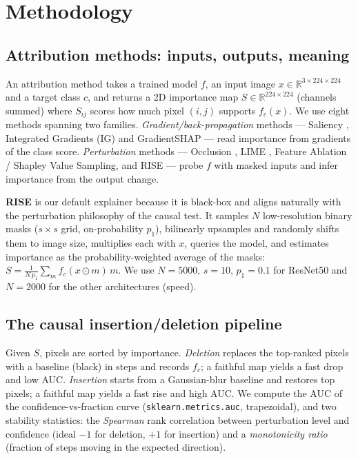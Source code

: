 \documentclass[11pt]{article}
\begin{document}
\section{Methodology}

\subsection{Attribution methods: inputs, outputs, meaning}
An attribution method takes a trained model $f$, an input image
$x\in\mathbb{R}^{3\times224\times224}$ and a target class $c$, and returns a 2D
importance map $S\in\mathbb{R}^{224\times224}$ (channels summed) where $S_{ij}$
scores how much pixel $(i,j)$ supports $f_c(x)$. We use eight methods spanning
two families. \emph{Gradient/back-propagation} methods --- Saliency
\citep{simonyan2014deep}, Integrated Gradients (IG)
\citep{sundararajan2017axiomatic} and GradientSHAP \citep{lundberg2017unified}
--- read importance from gradients of the class score. \emph{Perturbation}
methods --- Occlusion \citep{zeiler2014visualizing}, LIME
\citep{ribeiro2016why}, Feature Ablation / Shapley Value Sampling, and RISE
\citep{petsiuk2018rise} --- probe $f$ with masked inputs and infer importance
from the output change.

\textbf{RISE} is our default explainer because it is black-box and aligns
naturally with the perturbation philosophy of the causal test. It samples $N$
low-resolution binary masks ($s\times s$ grid, on-probability $p_1$), bilinearly
upsamples and randomly shifts them to image size, multiplies each with $x$,
queries the model, and estimates importance as the probability-weighted average
of the masks: $S = \frac{1}{N\,p_1}\sum_{m} f_c(x\odot m)\,m$. We use
$N{=}5000,\,s{=}10,\,p_1{=}0.1$ for ResNet50 and $N{=}2000$ for the other
architectures (speed).

\subsection{The causal insertion/deletion pipeline}
Given $S$, pixels are sorted by importance. \emph{Deletion} replaces the
top-ranked pixels with a baseline (black) in steps and records $f_c$; a faithful
map yields a fast drop and low AUC. \emph{Insertion} starts from a Gaussian-blur
baseline and restores top pixels; a faithful map yields a fast rise and high
AUC. We compute the AUC of the confidence-vs-fraction curve
(\texttt{sklearn.metrics.auc}, trapezoidal), and two stability statistics: the
\emph{Spearman} rank correlation between perturbation level and confidence
(ideal $-1$ for deletion, $+1$ for insertion) and a \emph{monotonicity ratio}
(fraction of steps moving in the expected direction).
\end{document}
